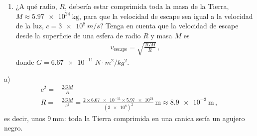 \documentclass[12pt, a4paper]{article}
\begin{document}
\begin{exercise}[ID=escape, tags={parcial2}, points=16, nuevapagina=true]
\begin{enumerate}
    \item ¿A qué radio, $R$, debería estar comprimida toda la masa de la Tierra, $M\approx \qty{5.97e24}{\kilo\g}$, para que la velocidad de escape sea igual a la velocidad de la luz, $c=\qty{3e8}{m/s}$? Tenga en cuenta que la velocidad de escape desde la superficie de una esfera de radio $R$ y masa $M$ es
\begin{align*}
    v_{\text{escape}} = \sqrt{\frac{2 G M}{R}}\,,
\end{align*}
donde $G=\qty{6.67e-11}{{N\cdot m^2}/{kg^2}}$.
\end{enumerate}

\vspace{6cm}
\end{exercise}
\begin{solution}
a)
\begin{align*}
    c^2 =& \frac{2GM}{R}\\
    R =& \frac{2GM}{c^2} = \frac{2\times\num{6.67e-11}\times\num{5.97e24}}{(\num{3e8})^2}\,\unit{\m} \approx \qty{8.9e-3}{\m}\,,
\end{align*}
es decir, unos $\qty{9}{\mm}$: toda la Tierra comprimida en una canica sería un agujero negro.
\end{solution}
\end{document}
